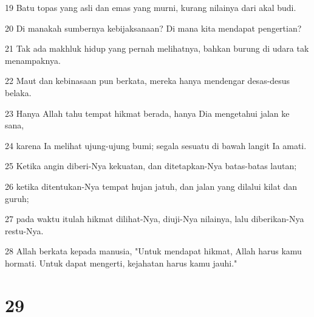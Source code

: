 \par 19 Batu topas yang asli dan emas yang murni, kurang nilainya dari akal budi.
\par 20 Di manakah sumbernya kebijaksanaan? Di mana kita mendapat pengertian?
\par 21 Tak ada makhluk hidup yang pernah melihatnya, bahkan burung di udara tak menampaknya.
\par 22 Maut dan kebinasaan pun berkata, mereka hanya mendengar desas-desus belaka.
\par 23 Hanya Allah tahu tempat hikmat berada, hanya Dia mengetahui jalan ke sana,
\par 24 karena Ia melihat ujung-ujung bumi; segala sesuatu di bawah langit Ia amati.
\par 25 Ketika angin diberi-Nya kekuatan, dan ditetapkan-Nya batas-batas lautan;
\par 26 ketika ditentukan-Nya tempat hujan jatuh, dan jalan yang dilalui kilat dan guruh;
\par 27 pada waktu itulah hikmat dilihat-Nya, diuji-Nya nilainya, lalu diberikan-Nya restu-Nya.
\par 28 Allah berkata kepada manusia, "Untuk mendapat hikmat, Allah harus kamu hormati. Untuk dapat mengerti, kejahatan harus kamu jauhi."

\chapter{29}


